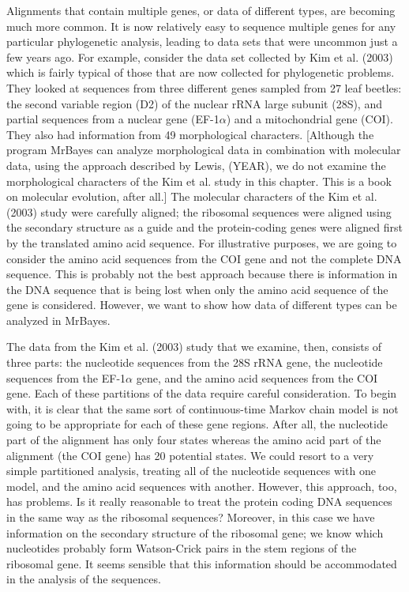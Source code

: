 \documentclass{svmult}
\begin{document}
Alignments that contain multiple genes, or data of different types, are becoming much more common. It is now relatively easy to sequence multiple genes for any
particular phylogenetic analysis, leading to data sets that were uncommon just a few years ago. For example, consider the data set collected by Kim et al. (2003)
which is fairly typical of those that are now collected for phylogenetic problems. They looked at sequences from three different genes sampled from 27 leaf beetles: 
the second variable region (D2)
of the nuclear rRNA large subunit (28S), and partial sequences from a nuclear gene (EF-1$\alpha$) and a mitochondrial gene (COI). They also had information from
49 morphological characters. [Although the program MrBayes can analyze morphological data in combination with molecular data, using the approach described
by Lewis, (YEAR), we do not examine the morphological characters of the Kim et al. study in this chapter. This is a book on molecular evolution, after all.] The molecular characters of the Kim et al. (2003) study were
carefully aligned; the ribosomal sequences were aligned using the secondary structure as a guide and the protein-coding genes were aligned first by the translated
amino acid sequence. For illustrative purposes, we are going to consider the amino acid sequences from the COI gene and not the complete DNA sequence. This
is probably not the best approach because there is information in the DNA sequence that is being lost when only the amino acid sequence of the gene is considered.
However, we want to show how data of different types can be analyzed in MrBayes.

The data from the Kim et al. (2003) study that we examine, then, consists of three parts: the nucleotide sequences from the 28S rRNA gene, the nucleotide sequences
from the EF-1$\alpha$ gene, and the amino acid sequences from the COI gene. Each of these partitions of the data require careful consideration. To begin with, it is
clear that the same sort of continuous-time Markov chain model is not going to be appropriate for each of these gene regions. After all, the nucleotide part of the alignment
has only four states whereas the amino acid part of the alignment (the COI gene) has 20 potential states. We could resort to a very simple partitioned analysis, treating
all of the nucleotide sequences with one model, and the amino acid sequences with another. However, this approach, too, has problems. Is it really reasonable to treat
the protein coding DNA sequences in the same way as the ribosomal sequences? Moreover, in this case we have information on the secondary structure of the
ribosomal gene; we know which nucleotides probably form Watson-Crick pairs in the stem regions of the ribosomal gene. It seems sensible that this information should
be accommodated in the analysis of the sequences. 
\end{document}

